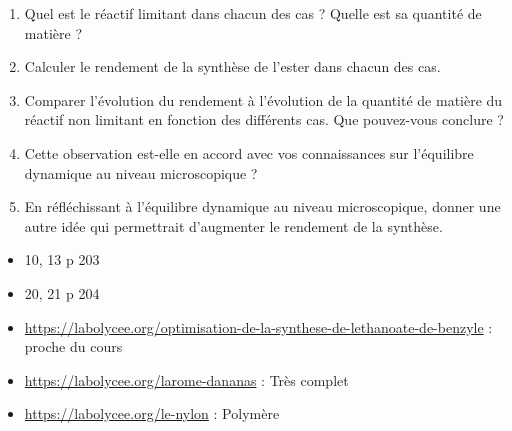 \begin{enumerate}
\item Quel est le réactif limitant dans chacun des cas ? Quelle est sa quantité de matière ?\\
\item Calculer le rendement de la synthèse de l'ester dans chacun des cas.\\
\item Comparer l'évolution du rendement à l'évolution de la quantité de matière du réactif non limitant en fonction des différents cas. Que pouvez-vous conclure ?\\
\item Cette observation est-elle en accord avec vos connaissances sur l'équilibre dynamique au niveau microscopique ?\\
\item En réfléchissant à l'équilibre dynamique au niveau microscopique, donner une autre idée qui permettrait d'augmenter le rendement de la synthèse.\\
\end{enumerate}




\begin{itemize}
	\item 10, 13 p 203
	\item 20, 21 p 204 
\end{itemize}

\begin{itemize}
	\item \url{https://labolycee.org/optimisation-de-la-synthese-de-lethanoate-de-benzyle} : proche du cours
	\item \url{https://labolycee.org/larome-dananas} : Très complet
	\item \url{https://labolycee.org/le-nylon} : Polymère
\end{itemize}
 